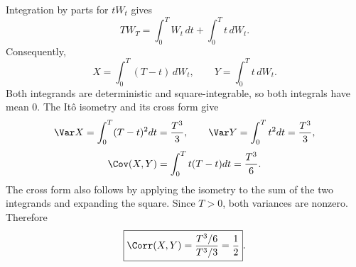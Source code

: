 Integration by parts for $tW_t$ gives
\[
 TW_T=\int_0^T W_t\,dt+\int_0^T t\,dW_t.
\]
Consequently,
\[
 X=\int_0^T(T-t)\,dW_t,\qquad
 Y=\int_0^T t\,dW_t.
\]
Both integrands are deterministic and square-integrable, so both integrals have mean 0. The It\^o isometry and its cross form give
\[
 \Var X=\int_0^T(T-t)^2dt=\frac{T^3}{3},\qquad
 \Var Y=\int_0^Tt^2dt=\frac{T^3}{3},
\]
\[
 \Cov(X,Y)=\int_0^Tt(T-t)dt=\frac{T^3}{6}.
\]
The cross form also follows by applying the isometry to the sum of the two integrands and expanding the square. Since $T>0$, both variances are nonzero. Therefore
\[
 \boxed{\Corr(X,Y)=\frac{T^3/6}{T^3/3}=\frac12}.
\]
